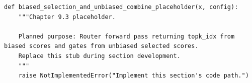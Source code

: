 \begin{lstlisting}[style=bookpython,caption={Planned code placeholder for biased selection and unbiased combine.},label={lst:ch09-biased-selection-and-unbiased-combine}]
def biased_selection_and_unbiased_combine_placeholder(x, config):
    """Chapter 9.3 placeholder.

    Planned purpose: Router forward pass returning topk_idx from biased scores and gates from unbiased selected scores.
    Replace this stub during section development.
    """
    raise NotImplementedError("Implement this section's code path.")
\end{lstlisting}
